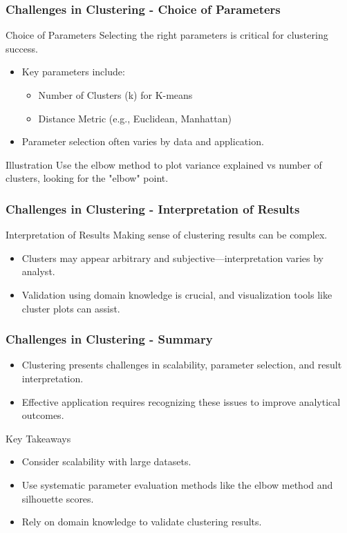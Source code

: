 \documentclass[aspectratio=169]{beamer}
\begin{document}
\begin{frame}[fragile]
    \frametitle{Challenges in Clustering - Choice of Parameters}
    \begin{block}{Choice of Parameters}
        Selecting the right parameters is critical for clustering success.
    \end{block}
    \begin{itemize}
        \item Key parameters include:
            \begin{itemize}
                \item Number of Clusters (k) for K-means
                \item Distance Metric (e.g., Euclidean, Manhattan)
            \end{itemize}
        \item Parameter selection often varies by data and application.
    \end{itemize}
    \begin{exampleblock}{Illustration}
        Use the elbow method to plot variance explained vs number of clusters, looking for the "elbow" point.
    \end{exampleblock}
\end{frame}

\begin{frame}[fragile]
    \frametitle{Challenges in Clustering - Interpretation of Results}
    \begin{block}{Interpretation of Results}
        Making sense of clustering results can be complex.
    \end{block}
    \begin{itemize}
        \item Clusters may appear arbitrary and subjective—interpretation varies by analyst.
        \item Validation using domain knowledge is crucial, and visualization tools like cluster plots can assist.
    \end{itemize}
\end{frame}

\begin{frame}[fragile]
    \frametitle{Challenges in Clustering - Summary}
    \begin{itemize}
        \item Clustering presents challenges in scalability, parameter selection, and result interpretation.
        \item Effective application requires recognizing these issues to improve analytical outcomes.
    \end{itemize}
    \begin{block}{Key Takeaways}
        \begin{itemize}
            \item Consider scalability with large datasets.
            \item Use systematic parameter evaluation methods like the elbow method and silhouette scores.
            \item Rely on domain knowledge to validate clustering results.
        \end{itemize}
    \end{block}
\end{frame}
\end{document}
